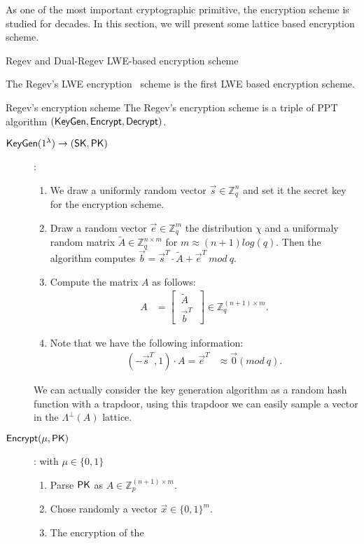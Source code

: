 As one of the most important cryptographic primitive, the encryption scheme is studied for decades. In this section, we will present some lattice based encryption scheme.

\begin{section}{Regev and Dual-Regev LWE-based encryption scheme}
  
The Regev's LWE encryption~\cite{DBLP:conf/stoc/Regev05} scheme is the first LWE based encryption scheme.

\begin{construction}{Regev's encryption scheme}
  The Regev's encryption scheme is a triple of PPT algorithm $({\mathsf{KeyGen}}, {\mathsf{Encrypt}}, {\mathsf{Decrypt}})$.
  \begin{description}
  \item[${\mathsf{KeyGen}}(1^\lambda) \to (\mathsf{SK}, \mathsf{PK})$]: 
    \begin{enumerate}
    \item We draw a uniformly random vector $\vec{s} \in \mathbb{Z}_q^n$ and set it the secret key for the encryption scheme.
    \item Draw a random vector $\vec{e} \in \mathbb{Z}_q^m$ \wrt the distribution $\chi$ and a uniformaly random matrix $\tilde{A} \in \mathbb{Z}_q^{n \times m}$ for $m \approx (n+1) log(q)$. Then the algorithm computes $\vec{b} = \vec{s}^T \cdot \tilde{A} + \vec{e}^T~mod~q$.
    \item Compute the matrix $A$ as follows:
      \begin{align*}
        A &= \left[ \begin{matrix} ~\tilde{A}~ \\ ~\vec{b}^T~ \end{matrix} \right] \in \mathbb{Z}_q^{(n+1) \times m}.
      \end{align*}
    \item Note that we have the following information:
      \begin{align*}
        (-\vec{s}^T, 1) \cdot A = \vec{e}^T &\approx \vec{0} (mod~ q).
      \end{align*}
    \end{enumerate}
    We can actually consider the key generation algorithm as a random hash function with a trapdoor, using this trapdoor we can easily sample a vector in the $\Lambda^{\bot}(A)$ lattice.

    \item[${\mathsf{Encrypt}}(\mu, \mathsf{PK})$]: with $\mu \in \{0, 1\}$
      \begin{enumerate}
      \item Parse $\mathsf{PK}$ as $A \in \mathbb{Z}_p^{(n+1) \times m}$.
      \item Chose randomly a vector $\vec{x} \in \{0,1\}^m$.
      \item The encryption of the
      \end{enumerate}
  \end{description}
\end{construction}
  

\end{section}